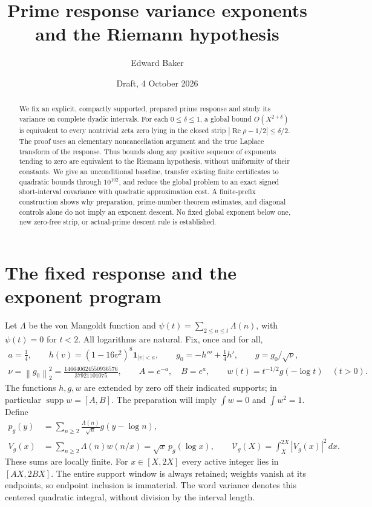 \documentclass[11pt]{article}
\title{Prime response variance exponents and the Riemann hypothesis}
\author{Edward Baker}
\date{Draft, 4 October 2026}
\theoremstyle{remark}
\newcommand{\dd}{\,d}
\newcommand{\Vcal}{\mathcal V_g}
\newcommand{\Rea}{\operatorname{Re}}
\newcommand{\norm}[1]{\left\|#1\right\|}
\DeclareMathOperator{\supp}{supp}
\numberwithin{equation}{section}
\begin{document}
\maketitle
\begin{abstract}
We fix an explicit, compactly supported, prepared prime response and study
its variance on complete dyadic intervals. For each $0\le\delta\le1$, a
global bound $O(X^{2+\delta})$ is equivalent to every nontrivial zeta zero
lying in the closed strip $|\Rea\rho-1/2|\le\delta/2$. The proof uses an
elementary noncancellation argument and the true Laplace transform of the
response. Thus bounds along any positive sequence of exponents tending
to zero are equivalent to the Riemann hypothesis, without uniformity of
their constants. We give an unconditional baseline, transfer existing
finite certificates to quadratic bounds through $10^{102}$, and reduce
the global problem to an exact signed short-interval covariance with
quadratic approximation cost. A finite-prefix construction shows why
preparation, prime-number-theorem estimates, and diagonal controls alone
do not imply an exponent descent. No fixed global exponent below one,
new zero-free strip, or actual-prime descent rule is established.
\end{abstract}

\section{The fixed response and the exponent program}
Let $\Lambda$ be the von Mangoldt function and
$\psi(t)=\sum_{2\le n\le t}\Lambda(n)$, with $\psi(t)=0$ for $t<2$.
All logarithms are natural. Fix, once and for all,
\begin{equation}\label{eq:probe}
\begin{gathered}
a=\tfrac14,\qquad h(v)=(1-16v^2)^8\mathbf1_{|v|<a},\qquad
g_0=-h'''+\tfrac14h',\qquad g=g_0/\sqrt\nu,\\
\nu=\norm{g_0}_2^2=\frac{146640624550936576}{37921101075},\qquad
A=e^{-a},\quad B=e^a,\qquad w(t)=t^{-1/2}g(-\log t)\quad(t>0).
\end{gathered}
\end{equation}
The functions $h,g,w$ are extended by zero off their indicated supports;
in particular $\supp w=[A,B]$. The preparation will imply
$\int w=0$ and $\int w^2=1$. Define
\begin{equation}\label{eq:response}
\begin{split}
p_g(y)&=\sum_{n\ge2}\frac{\Lambda(n)}{\sqrt n}g(y-\log n),\\
V_g(x)&=\sum_{n\ge2}\Lambda(n)w(n/x)=\sqrt x\,p_g(\log x),\qquad
\Vcal(X)=\int_X^{2X}|V_g(x)|^2\dd x.
\end{split}
\end{equation}
These sums are locally finite. For $x\in[X,2X]$ every active integer
lies in $[AX,2BX]$. The entire support window is always retained;
weights vanish at its endpoints, so endpoint inclusion is immaterial.
The word variance denotes this centered quadratic integral, without
division by the interval length.
\end{document}
